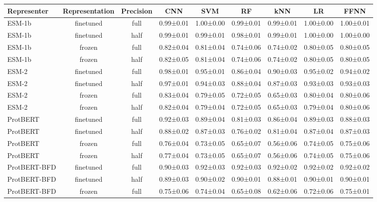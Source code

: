 \begin{tabular}{lcccccccc}
\toprule
 \textbf{Representer} & \textbf{Representation} & \textbf{Precision} &       \textbf{CNN} &       \textbf{SVM} &        \textbf{RF} &       \textbf{kNN} &        \textbf{LR} &      \textbf{FFNN} \\
\midrule
      ESM-1b &      finetuned &      full & 0.99±0.01 & 1.00±0.00 & 0.99±0.01 & 0.99±0.01 & 1.00±0.00 & 1.00±0.01 \\
      ESM-1b &      finetuned &      half & 0.99±0.01 & 0.99±0.01 & 0.98±0.01 & 0.99±0.01 & 1.00±0.00 & 1.00±0.00 \\
      ESM-1b &         frozen &      full & 0.82±0.04 & 0.81±0.04 & 0.74±0.06 & 0.74±0.02 & 0.80±0.05 & 0.80±0.05 \\
      ESM-1b &         frozen &      half & 0.82±0.05 & 0.81±0.04 & 0.74±0.06 & 0.74±0.02 & 0.80±0.05 & 0.80±0.05 \\
       ESM-2 &      finetuned &      full & 0.98±0.01 & 0.95±0.01 & 0.86±0.04 & 0.90±0.03 & 0.95±0.02 & 0.94±0.02 \\
       ESM-2 &      finetuned &      half & 0.97±0.01 & 0.94±0.03 & 0.88±0.04 & 0.87±0.03 & 0.93±0.03 & 0.93±0.03 \\
       ESM-2 &         frozen &      full & 0.83±0.04 & 0.79±0.05 & 0.72±0.05 & 0.65±0.03 & 0.80±0.04 & 0.80±0.06 \\
       ESM-2 &         frozen &      half & 0.82±0.04 & 0.79±0.04 & 0.72±0.05 & 0.65±0.03 & 0.79±0.04 & 0.80±0.06 \\
    ProtBERT &      finetuned &      full & 0.92±0.03 & 0.89±0.04 & 0.81±0.03 & 0.86±0.04 & 0.89±0.03 & 0.88±0.03 \\
    ProtBERT &      finetuned &      half & 0.88±0.02 & 0.87±0.03 & 0.76±0.02 & 0.81±0.04 & 0.87±0.04 & 0.87±0.03 \\
    ProtBERT &         frozen &      full & 0.76±0.04 & 0.73±0.05 & 0.65±0.07 & 0.56±0.06 & 0.74±0.05 & 0.75±0.06 \\
    ProtBERT &         frozen &      half & 0.77±0.04 & 0.73±0.05 & 0.65±0.07 & 0.56±0.06 & 0.74±0.05 & 0.75±0.06 \\
ProtBERT-BFD &      finetuned &      full & 0.90±0.03 & 0.92±0.03 & 0.92±0.03 & 0.92±0.02 & 0.92±0.02 & 0.92±0.02 \\
ProtBERT-BFD &      finetuned &      half & 0.89±0.03 & 0.90±0.02 & 0.90±0.01 & 0.88±0.01 & 0.90±0.01 & 0.90±0.01 \\
ProtBERT-BFD &         frozen &      full & 0.75±0.06 & 0.74±0.04 & 0.65±0.08 & 0.62±0.06 & 0.72±0.06 & 0.75±0.01 \\

\end{tabular}
